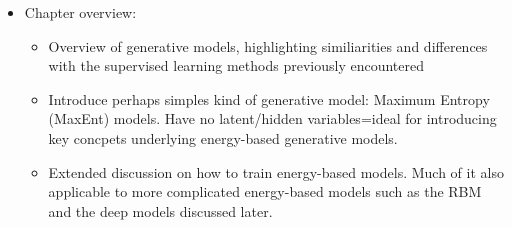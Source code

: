 \documentclass[norsk,a4paper,11pt]{article}
\begin{document}
\begin{itemize}
\begin{itemize}
	\end{itemize}
	\item Chapter overview:
	\begin{itemize}
		\item Overview of generative models, highlighting similiarities and differences with the supervised learning methods previously encountered
		\item Introduce perhaps simples kind of generative model: Maximum Entropy (MaxEnt) models. Have no latent/hidden variables=ideal for introducing key concpets underlying energy-based generative models.
		\item Extended discussion on how to train energy-based models. Much of it also applicable to more complicated energy-based models such as the RBM and the deep models discussed later.
	\end{itemize}
\end{itemize}
\end{document}

